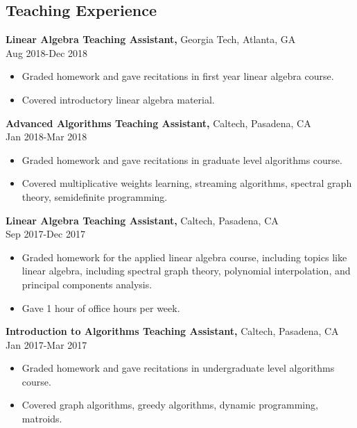 \documentclass[margin]{res}
\begin{document}
\begin{resume}
\section{Teaching Experience}
{\bf Linear Algebra Teaching Assistant,} Georgia Tech, Atlanta, GA \\ Aug 2018-Dec 2018
\begin{itemize} \itemsep -2pt %
    \item Graded homework and gave recitations in first year linear algebra course.
    \item Covered introductory linear algebra material.
\end{itemize}
 
{\bf Advanced Algorithms Teaching Assistant,} Caltech, Pasadena, CA \\ Jan 2018-Mar 2018
\begin{itemize} \itemsep -2pt %
\item Graded homework and gave recitations in graduate level algorithms course.
\item Covered multiplicative weights learning, streaming algorithms,
spectral graph theory, semidefinite programming.
\end{itemize}
 
{\bf Linear Algebra Teaching Assistant,} Caltech, Pasadena, CA \\ Sep 2017-Dec 2017
\begin{itemize} \itemsep -2pt %
\item Graded homework for the applied linear algebra course, including topics like linear algebra, including spectral graph theory, polynomial
interpolation, and principal components analysis.
\item Gave 1 hour of office hours per week.
\end{itemize}
 
{\bf Introduction to Algorithms Teaching Assistant,} Caltech, Pasadena, CA \\ Jan 2017-Mar 2017
\begin{itemize} \itemsep -2pt %
\item Graded homework and gave recitations in undergraduate level algorithms course.
\item Covered graph algorithms, greedy algorithms, dynamic programming, matroids.
\end{itemize}


\end{resume}
\end{document}
